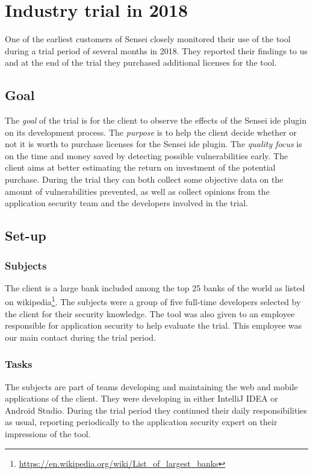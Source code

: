 \section{Industry trial in 2018}
\label{sec:trial2018}

One of the earliest customers of Sensei closely monitored their use of the tool during a trial period of several months in 2018.
They reported their findings to us and at the end of the trial they purchased additional licenses for the tool.

\subsection{Goal}
The \textit{goal} of the trial is for the client to observe the effects of the Sensei \gls{ide} plugin on its development process.
The \textit{purpose} is to help the client decide whether or not it is worth to purchase licenses for the Sensei \gls{ide} plugin.
The \textit{quality focus} is on the time and money saved by detecting possible vulnerabilities early.
The client aims at better estimating the return on investment of the potential purchase.
During the trial they can both collect some objective data on the amount of vulnerabilities prevented, as well as collect opinions from the application security team and the developers involved in the trial.

\subsection{Set-up}
\subsubsection{Subjects}
The client is a large bank included among the top 25 banks of the world as listed on wikipedia\footnote{\url{https://en.wikipedia.org/wiki/List\_of\_largest\_banks}}. The subjects were a group of five full-time developers selected by the client for their security knowledge. The tool was also given to an employee responsible for application security to help evaluate the trial. This employee was our main contact during the trial period.

\subsubsection{Tasks}
The subjects are part of teams developing and maintaining the web and mobile applications of the client. They were developing in either IntelliJ IDEA or Android Studio. During the trial period they continued their daily responsibilities as usual, reporting periodically to the application security expert on their impressions of the tool.

